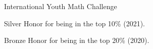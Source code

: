 \entryItem
	{International Youth Math Challenge}
	{}

	\begin{items}
		\item Silver Honor for being in the top 10\% (2021).
		\item Bronze Honor for being in the top 20\% (2020).
	\end{items}
